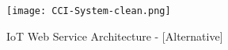 \begin{figure}[!h]
    \centering
    \texttt{[image: CCI-System-clean.png]}
    \caption{IoT Web Service Architecture - [Alternative]}\label{fig::arch}
\end{figure}